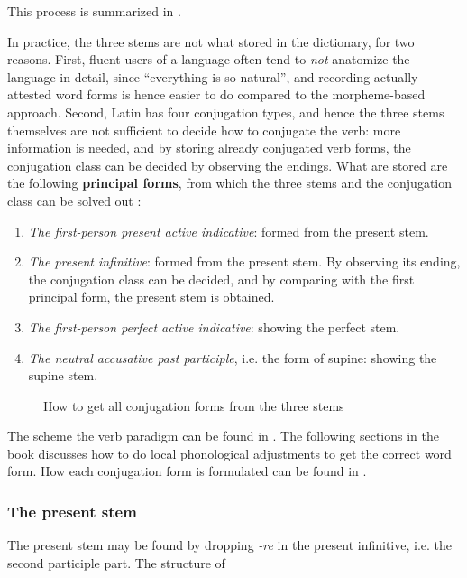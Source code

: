 \documentclass{article}
\newcommand*{\citesec}[1]{\S~{#1}}
\newcommand*{\concept}[1]{\textbf{#1}}
\newcommand*{\corpus}[1]{\emph{#1}}
\begin{document}
This process is summarized in .

In practice, the three stems are not what stored in the dictionary,
for two reasons.
First, fluent users of a language often 
tend to \emph{not} anatomize the language in detail,
since ``everything is so natural'', 
and recording actually attested word forms is hence easier to do
compared to the morpheme-based approach.
Second, Latin has four conjugation types,
and hence the three stems themselves are not sufficient to decide how to conjugate the verb:
more information is needed, 
and by storing already conjugated verb forms,
the conjugation class can be decided by observing the endings.
What are stored are the following \concept{principal forms},
from which the three stems and the conjugation class can be solved out
\citep[\citesec{172}]{allen1903allen}:
\begin{enumerate}
    \item \emph{The first-person present active indicative}: formed from the present stem.
    \item \emph{The present infinitive}: formed from the present stem. 
    By observing its ending, the conjugation class can be decided,
    and by comparing with the first principal form, 
    the present stem is obtained.
    \item \emph{The first-person perfect active indicative}: showing the perfect stem.
    \item \emph{The neutral accusative past participle}, i.e. the form of supine: showing the supine stem.
\end{enumerate}

\begin{sidewaysfigure}
    \centering
    
    \caption{How to get all conjugation forms from the three stems}
    \label{fig:stem-to-form}
\end{sidewaysfigure}

The scheme the verb paradigm can be found in \citep[\citesec{166}]{allen1903allen}.
The following sections in the book discusses how to do local phonological adjustments 
to get the correct word form.
How each conjugation form is formulated can be found in \citep[\citesec{180}]{allen1903allen}.

\subsubsection{The present stem}

The present stem may be found by dropping \corpus{-re} in the present infinitive, 
i.e. the second participle part.
The structure of 
\end{document}
